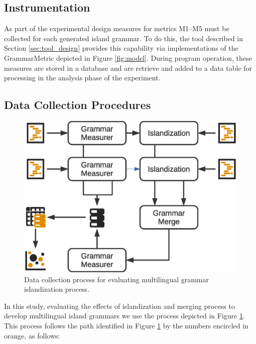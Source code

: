 \documentclass[10pt,nocc]{xrese_report}
\begin{document}
\subsection{Instrumentation}

As part of the experimental design measures for metrics M1--M5 must be collected for each generated island grammar. To do this, the tool described in Section \ref{sec:tool_design} provides this capability via implementations of the GrammarMetric depicted in Figure \ref{fig:model}. During program operation, these measures are stored in a database and are retrieve and added to a data table for processing in the analysis phase of the experiment.

\subsection{Data Collection Procedures}

\begin{figure}[tb]
\centering
\includegraphics[width=\textwidth]{images/paper/dc_pair.eps}
\caption{Data collection process for evaluating multilingual grammar islandization process.}\label{fig:dc_pair}
\end{figure}

In this study, evaluating the effects of islandization and merging process to develop multilingual island grammars we use the process depicted in Figure \ref{fig:dc_pair}. This process follows the path identified in Figure \ref{fig:dc_pair} by the numbers encircled in orange, as follows:
\end{document}
